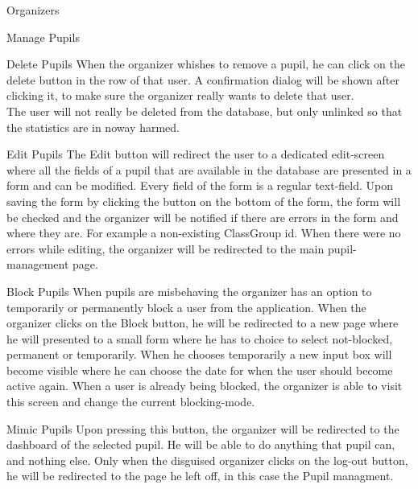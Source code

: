 \begin{section}{Organizers}
\begin{subsection}{Manage Pupils}
		\begin{subsubsection}{Delete Pupils}
			When the organizer whishes to remove a pupil, he can click on the delete
			button in the row of that user. A confirmation dialog will be shown after
			clicking it, to make sure the organizer really wants to delete that user. \\
			The user will not really be deleted from the database, but only unlinked so
			that the statistics are in noway harmed.
		\end{subsubsection}
		\begin{subsubsection}{Edit Pupils}
			\label{sec:organizer_edit_pupils}
			The Edit button will redirect the user to a dedicated edit-screen where all
			the fields of a pupil that are available in the database are presented in a
			form and can be modified. Every field of the form is a regular text-field.
			Upon saving the form by clicking the button on the bottom of the form, the
			form will be checked and the organizer will be notified if there are errors
			in the form and where they are. For example a non-existing ClassGroup id.
			When there were no errors while editing, the organizer will be redirected to
			the main pupil-management page.
		\end{subsubsection}
		\begin{subsubsection}{Block Pupils}
			\label{sec:organizer_block_pupils}
			When pupils are misbehaving the organizer has an option to temporarily or
			permanently block a user from the application. When the organizer clicks on
			the Block button, he will be redirected to a new page where he will presented
			to a small form where he has to choice to select not-blocked, permanent or
			temporarily. When he chooses temporarily a new input box will become visible
			where he can choose the date for when the user should become active again.
			When a user is already being blocked,
			the organizer is able to visit this screen and change the current
			blocking-mode.
		\end{subsubsection}
		\begin{subsubsection}{Mimic Pupils}
			Upon pressing this button, the organizer will be redirected to the dashboard
			of the selected pupil. He will be able to do anything that pupil can, and
			nothing else. Only when the disguised organizer clicks on the log-out button,
			he will be redirected to the page he left off, in this case the Pupil
			managment.
		\end{subsubsection}
		
	\end{subsection}
	

\end{section}
